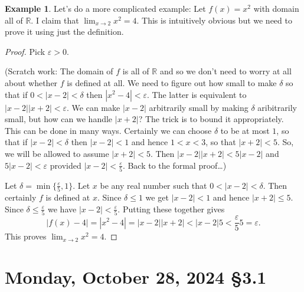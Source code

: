 \documentclass[12pt]{amsart}
\def\Mo{Monday}
\def\d{\delta}
\def\e{\varepsilon}
\newcommand{\R}{{\mathbb{R}}}
\numberwithin{equation}{section}
\theoremstyle{plain} %
\newcommand{\Oct}[3]{\section{#2, October #1, 2024 \quad \S#3}}
\theoremstyle{definition}
\newtheorem{ex}[equation]{Example}
\theoremstyle{remark}
\begin{document}
\begin{ex} Let's do a more complicated example: Let $f(x) = x^2$ with  domain all of $\R$. I claim that $\lim_{x \to 2} x^2 = 4$. This is intuitively
  obvious but we need to prove it using just the definition.

\begin{proof}
  Pick $\e > 0$.

  (Scratch work: The domain of $f$ is all of $\R$ and so we don't need to worry at all about whether $f$ is defined at all.
  We need to figure out how small to make $\d$ so that if $0 < |x-2| < \d$ then $|x^2 - 4| < \e$. The latter
is equivalent to $|x-2||x+2| < \e$. We can make $|x-2|$ arbitrarily small by making $\d$
aribitrarily small, but how can we handle $|x+2|$? The trick is to bound it appropriately. This can be done in many ways. Certainly we can choose $\d$ to
be at most $1$, so that if $|x-2| < \d$ then $|x-2| < 1$ and hence $1 < x < 3$, so that $|x+2| < 5$. So, we will be allowed to assume $|x+2| < 5$. Then
$|x-2||x+2| < 5 |x-2|$ and $5 |x-2| < \e$ provided $|x-2| < \frac{\e}{5}$. Back to the formal proof\dots)

Let $\d = \min\{\frac{\e}{5}, 1\}$. Let $x$ be any real number such that  ${0 < |x-2| < \d}$. Then certainly $f$ is defined at $x$. 
Since $\d \leq 1$ we get $|x-2| < 1$ and hence $|x+2| \leq
5$. Since $\d \leq \frac{\e}{5}$ we have  $|x-2|  < \frac{\e}{5}$. Putting these together gives
$$
|f(x) - 4| = |x^2 - 4| = |x-2||x+2| < |x-2| 5 < \frac{\e}{5} 5 = \e.
$$
This proves $\lim_{x \to 2} x^2 = 4$. 
\end{proof}
\end{ex}


\newpage

\Oct{28}{\Mo}{3.1}
\end{document}

